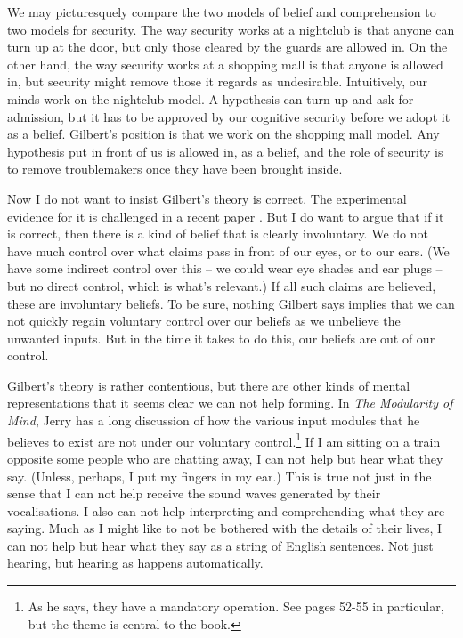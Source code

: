 We may picturesquely compare the two models of belief and comprehension to two models for security. The way security works at a nightclub is that anyone can turn up at the door, but only those cleared by the guards are allowed in. On the other hand, the way security works at a shopping mall is that anyone is allowed in, but security might remove those it regards as undesirable. Intuitively, our minds work on the nightclub model. A hypothesis can turn up and ask for admission, but it has to be approved by our cognitive security before we adopt it as a belief. Gilbert's position is that we work on the shopping mall model. Any hypothesis put in front of us is allowed in, as a belief, and the role of security is to remove troublemakers once they have been brought inside.

Now I do not want to insist Gilbert's theory is correct. The experimental evidence for it is challenged in a recent paper \citep{HassonSimmonsTodorov2005}. But I do want to argue that if it is correct, then there is a kind of belief that is clearly involuntary. We do not have much control over what claims pass in front of our eyes, or to our ears. (We have some indirect control over this -- we could wear eye shades and ear plugs -- but no direct control, which is what's relevant.) If all such claims are believed, these are involuntary beliefs. To be sure, nothing Gilbert says implies that we can not quickly regain voluntary control over our beliefs as we unbelieve the unwanted inputs. But in the time it takes to do this, our beliefs are out of our control.

Gilbert's theory is rather contentious, but there are other kinds of mental representations that it seems clear we can not help forming. In \textit{The Modularity of Mind}, Jerry \citeauthor{Fodor1983} has a long discussion of how the various input modules that he believes to exist are not under our voluntary control.\footnote{As he says, they have a mandatory operation. See pages 52-55 in particular, but the theme is central to the book.} If I am sitting on a train opposite some people who are chatting away, I can not help but hear what they say. (Unless, perhaps, I put my fingers in my ear.) This is true not just in the sense that I can not help receive the sound waves generated by their vocalisations. I also can not help interpreting and comprehending what they are saying. Much as I might like to not be bothered with the details of their lives, I can not help but hear what they say as a string of English sentences. Not just hearing, but hearing as happens automatically.


